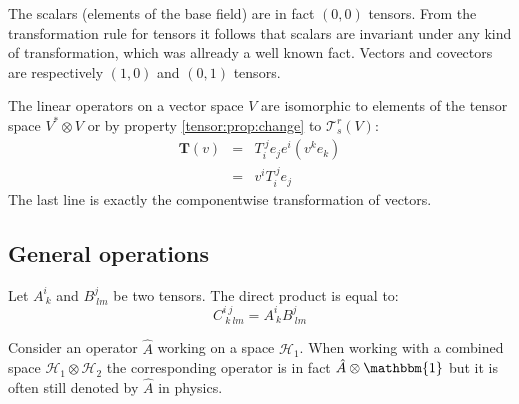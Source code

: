     \begin{example}
    	The scalars (elements of the base field) are in fact $(0,0)$ tensors. From the transformation rule for tensors it follows that scalars are invariant under any kind of transformation, which was allready a well known fact. Vectors and covectors are respectively $(1, 0)$ and $(0, 1)$ tensors.
    \end{example}
    \begin{example}
    	The linear operators on a vector space $V$ are isomorphic to elements of the tensor space $V^*\otimes V$ or by property \ref{tensor:prop:change} to $\mathcal{T}^r_s(V)$:
        \[
        \begin{array}{ccl}
        	\mathbf{T}(v) &=& T_i^{\ j}e_je^i(v^ke_k)\\
            &=& v^iT_i^{\ j}e_j
        \end{array}
        \]
        The last line is exactly the componentwise transformation of vectors.
    \end{example}
	
\subsection{General operations}

    
	\begin{example}
		Let $A_{\ k}^i$ and $B_{\ lm}^j$ be two tensors. The direct product is equal to: \[C_{\ k\ lm}^{i\ j} = A_{\ k}^iB_{\ lm}^j\]
	\end{example}
    
	\begin{remark*}
	    	Consider an operator $\hat{A}$ working on a space $\mathcal{H}_1$. When working with a combined space $\mathcal{H}_1\otimes\mathcal{H}_2$ the corresponding operator is in fact $\hat{A}\otimes\mathbbm{1}$ but it is often still denoted by $\hat{A}$ in physics.
	\end{remark*}

